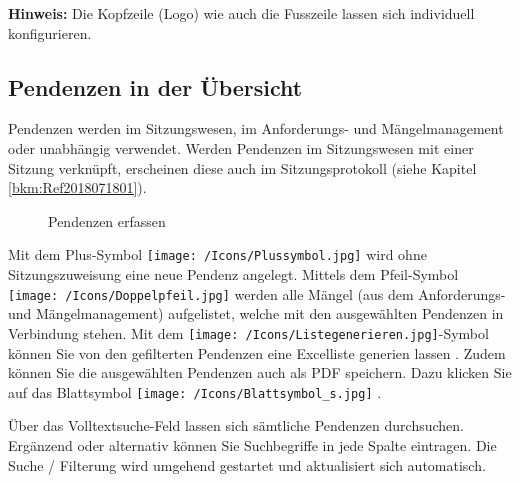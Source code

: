 \textbf{Hinweis:} Die Kopfzeile (Logo) wie auch die Fusszeile lassen sich individuell konfigurieren.

\clearpage
\subsection{Pendenzen in der Übersicht}
\label{bkm:Ref2018071802}

Pendenzen werden im Sitzungswesen, im Anforderungs- und Mängelmanagement oder unabhängig verwendet. Werden Pendenzen im Sitzungswesen mit einer Sitzung verknüpft, erscheinen diese auch im  Sitzungsprotokoll (siehe Kapitel \ref{bkm:Ref2018071801}).

\begin{figure}[H]
\caption{Pendenzen erfassen}
\end{figure}

Mit dem Plus-Symbol \texttt{[image: /Icons/Plussymbol.jpg]}  wird ohne Sitzungszuweisung eine neue Pendenz angelegt. Mittels dem Pfeil-Symbol \texttt{[image: /Icons/Doppelpfeil.jpg]}  werden alle Mängel (aus dem Anforderungs- und Mängelmanagement) aufgelistet, welche mit den ausgewählten Pendenzen in Verbindung stehen. Mit dem \texttt{[image: /Icons/Listegenerieren.jpg]}-Symbol können Sie von den gefilterten Pendenzen eine Excelliste generien lassen . Zudem können Sie die ausgewählten Pendenzen auch als PDF speichern. Dazu klicken Sie auf das Blattsymbol \texttt{[image: /Icons/Blattsymbol\_s.jpg]} .

\vspace{\baselineskip}

Über das Volltextsuche-Feld  lassen sich sämtliche Pendenzen durchsuchen. Ergänzend oder alternativ können Sie Suchbegriffe in jede Spalte eintragen. Die Suche / Filterung wird umgehend gestartet und aktualisiert sich automatisch.

